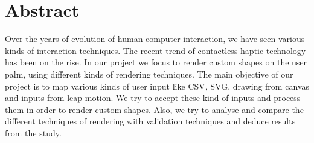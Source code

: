 %
\chapter*{Abstract}
\label{sec:abstract}
\vspace*{-10mm}
Over the years of evolution of human computer interaction, we have seen various kinds of interaction techniques. The recent trend of contactless haptic technology has been on the rise. In our project we focus to render custom shapes on the user palm, using different kinds of rendering techniques. The main objective of our project is to map various kinds of user input like CSV, SVG, drawing from canvas and inputs from leap motion. We try to accept these kind of inputs and process them in order to render custom shapes. Also, we try to analyse and compare the different techniques of rendering with validation techniques and deduce results from the study.  



